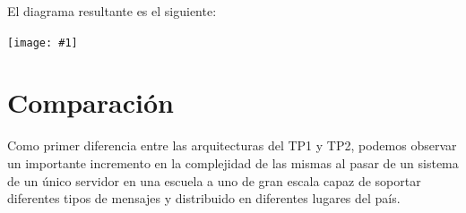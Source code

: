 \documentclass[a4paper, 10pt, twoside]{article}
\newcommand{\grafico}[1]{
  \begin{center}
    \texttt{[image: \#1]}
  \end{center}
}
\begin{document}
El diagrama resultante es el siguiente:

\grafico{./diagramas/arquitecturaTP1.png}
\newpage

\section{Comparación}
Como primer diferencia entre las arquitecturas del TP1 y TP2, podemos observar un importante incremento en la complejidad de las mismas al pasar de un sistema de un único servidor en una escuela a uno de gran escala capaz de soportar diferentes tipos de mensajes y distribuido en diferentes lugares del país.

\newpage
\end{document}
